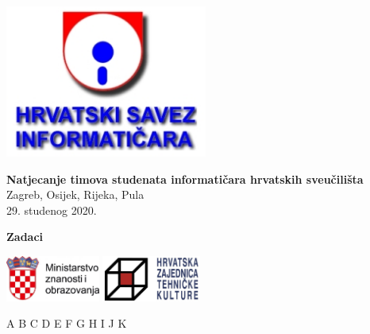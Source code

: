 \documentclass[a4paper]{article}
\begin{document}
\thispagestyle{empty}
\begin{center}
  \includegraphics[height=5cm]{pic/hsin.jpg}
\end{center}
\vspace{1cm}
\begin{center}
  {\Large\textbf{\textsf{Natjecanje timova studenata informatičara hrvatskih sveučilišta}}} \\
  \vspace{.5cm}
  {\large{\textsf{Zagreb, Osijek, Rijeka, Pula}}} \\
  \vspace{.3cm}
  \textsf{29. studenog 2020.}
\end{center}
\vspace{1cm}
\begin{center}
  {\large \textbf{Zadaci}}

  \begin{minipage}{.5\textwidth}
    \renewcommand\contentsname{}
    \tableofcontents
  \end{minipage}
\end{center}
\vspace{4cm}
\begin{center}
  \includegraphics[height=1.5cm]{pic/mzo.jpg}
  \hspace{2cm}
  \includegraphics[height=1.5cm]{pic/hztk.png}
\end{center}
\vspace{\fill}
\clearpage
\setcounter{page}{1}
{A}
{B}
{C}
{D}
{E}
{F}
{G}
{H}
{I}
{J}
{K}
\end{document}
